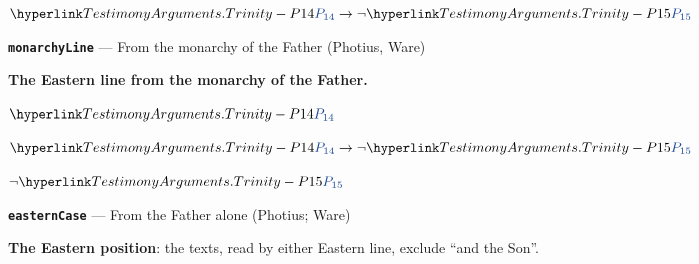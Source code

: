 \documentclass[11pt,paper=\testimonypaper,DIV=13,parskip=false]{scrartcl}
\begin{document}
\begin{derivation}
  \item[] \(\pvar{TestimonyArguments.Trinity}{14} \rightarrow \lnot \pvar{TestimonyArguments.Trinity}{15}\)
\end{derivation}
\par\medskip\noindent\textbf{\texttt{monarchy\allowbreak{}Line}} --- From the monarchy of the Father (Photius, Ware)\par\nobreak\noindent
\textbf{The Eastern line from the monarchy of the Father.}

\begin{derivation}
  \item[(1)] \(\pvar{TestimonyArguments.Trinity}{14}\)
  \item[(2)] \(\pvar{TestimonyArguments.Trinity}{14} \rightarrow \lnot \pvar{TestimonyArguments.Trinity}{15}\)
  \item[\(\vdash\)] \(\lnot \pvar{TestimonyArguments.Trinity}{15}\)
\end{derivation}
\par\medskip\noindent\textbf{\texttt{eastern\allowbreak{}Case}} --- From the Father alone (Photius; Ware)\par\nobreak\noindent
\textbf{The Eastern position}: the texts, read by either Eastern line, exclude “and the Son”.
\end{document}
